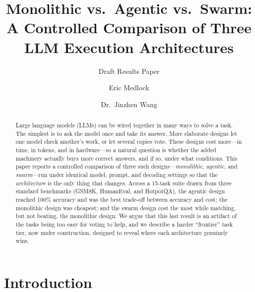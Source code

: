 \documentclass[sigconf,nonacm]{acmart}
\begin{document}
\title{Monolithic vs.\ Agentic vs.\ Swarm:\\A Controlled Comparison of Three LLM Execution Architectures}
\subtitle{Draft Results Paper}

\author{Eric Medlock}

\author{Dr.\ Jinzhen Wang}

\renewcommand{\shortauthors}{Medlock and Wang}

\begin{abstract}
Large language models (LLMs) can be wired together in many ways to solve a
task. The simplest is to ask the model once and take its answer. More elaborate
designs let one model check another's work, or let several copies vote. These
designs cost more---in time, in tokens, and in hardware---so a natural question
is whether the added machinery actually buys more correct answers, and if so,
under what conditions. This paper reports a controlled comparison of three such
designs---\emph{monolithic}, \emph{agentic}, and \emph{swarm}---run under
identical model, prompt, and decoding settings so that the \emph{architecture}
is the only thing that changes. Across a 15-task suite drawn from three standard
benchmarks (GSM8K, HumanEval, and HotpotQA), the agentic design reached 100\%
accuracy and was the best trade-off between accuracy and cost; the monolithic
design was cheapest; and the swarm design cost the most while matching, but not
beating, the monolithic design. We argue that this last result is an artifact of
the tasks being too easy for voting to help, and we describe a harder ``frontier''
task tier, now under construction, designed to reveal where each architecture
genuinely wins.
\end{abstract}


\maketitle

\section{Introduction}
\end{document}
